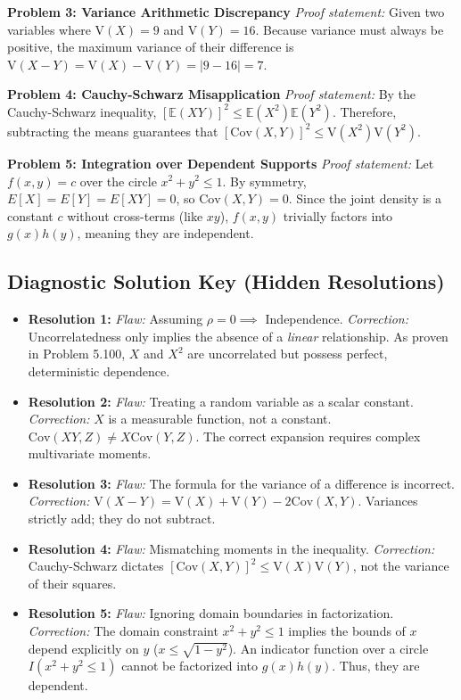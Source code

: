 \documentclass[11pt, a4paper]{article}
\theoremstyle{definition}
\theoremstyle{remark}
\newcommand{\E}{\mathbb{E}}
\newcommand{\Cov}{\mathrm{Cov}}
\newcommand{\Var}{\mathrm{V}}
\begin{document}
\textbf{Problem 3: Variance Arithmetic Discrepancy}
\textit{Proof statement:} Given two variables where $\Var(X) = 9$ and $\Var(Y) = 16$. Because variance must always be positive, the maximum variance of their difference is $\Var(X - Y) = \Var(X) - \Var(Y) = |9 - 16| = 7$.

\textbf{Problem 4: Cauchy-Schwarz Misapplication}
\textit{Proof statement:} By the Cauchy-Schwarz inequality, $[\E(XY)]^2 \le \E(X^2)\E(Y^2)$. Therefore, subtracting the means guarantees that $[\Cov(X,Y)]^2 \le \Var(X^2)\Var(Y^2)$.

\textbf{Problem 5: Integration over Dependent Supports}
\textit{Proof statement:} Let $f(x,y) = c$ over the circle $x^2 + y^2 \le 1$. By symmetry, $E[X]=E[Y]=E[XY]=0$, so $\Cov(X,Y)=0$. Since the joint density is a constant $c$ without cross-terms (like $xy$), $f(x,y)$ trivially factors into $g(x)h(y)$, meaning they are independent.

\vspace{2em}
\subsection*{Diagnostic Solution Key (Hidden Resolutions)}
\begin{itemize}
    \item \textbf{Resolution 1:} \textit{Flaw:} Assuming $\rho=0 \implies$ Independence. \textit{Correction:} Uncorrelatedness only implies the absence of a \textit{linear} relationship. As proven in Problem 5.100, $X$ and $X^2$ are uncorrelated but possess perfect, deterministic dependence.
    \item \textbf{Resolution 2:} \textit{Flaw:} Treating a random variable as a scalar constant. \textit{Correction:} $X$ is a measurable function, not a constant. $\Cov(XY, Z) \neq X \Cov(Y,Z)$. The correct expansion requires complex multivariate moments.
    \item \textbf{Resolution 3:} \textit{Flaw:} The formula for the variance of a difference is incorrect. \textit{Correction:} $\Var(X - Y) = \Var(X) + \Var(Y) - 2\Cov(X,Y)$. Variances strictly add; they do not subtract.
    \item \textbf{Resolution 4:} \textit{Flaw:} Mismatching moments in the inequality. \textit{Correction:} Cauchy-Schwarz dictates $[\Cov(X,Y)]^2 \le \Var(X)\Var(Y)$, not the variance of their squares.
    \item \textbf{Resolution 5:} \textit{Flaw:} Ignoring domain boundaries in factorization. \textit{Correction:} The domain constraint $x^2 + y^2 \le 1$ implies the bounds of $x$ depend explicitly on $y$ ($x \le \sqrt{1-y^2}$). An indicator function over a circle $I(x^2+y^2 \le 1)$ cannot be factorized into $g(x)h(y)$. Thus, they are dependent.
\end{itemize}
\end{document}
